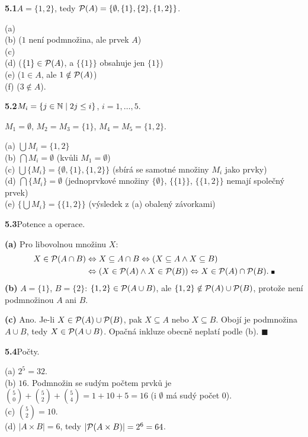 \documentclass[11pt,a4paper]{article}
\newcommand{\zad}[2]{\par\Needspace*{4cm}\vspace{1.1em}\noindent\textcolor{accent}{\sffamily\bfseries #1}\enspace #2\par}
\begin{document}

\zad{5.1}{$A=\{1,2\}$, tedy $\mathcal P(A)=\{\emptyset,\{1\},\{2\},\{1,2\}\}$.}
\begin{reseni}
(a) \pravda\\
(b) \nepravda ($1$ není podmnožina, ale prvek $A$)\\
(c) \pravda\\
(d) \pravda ($\{1\}\in\mathcal P(A)$, a $\{\{1\}\}$ obsahuje jen $\{1\}$)\\
(e) \nepravda ($1\in A$, ale $1\notin\mathcal P(A)$)\\
(f) \nepravda ($3\notin A$).
\end{reseni}

\zad{5.2}{$M_i=\{j\in\mathbb N\mid 2j\le i\}$, $i=1,\dots,5$.}
\begin{reseni}
$M_1=\emptyset$, $M_2=M_3=\{1\}$, $M_4=M_5=\{1,2\}$.

(a) $\bigcup M_i=\{1,2\}$\\
(b) $\bigcap M_i=\emptyset$ (kvůli $M_1=\emptyset$)\\
(c) $\bigcup\{M_i\}=\{\emptyset,\{1\},\{1,2\}\}$ (sbírá se samotné množiny $M_i$ jako prvky)\\
(d) $\bigcap\{M_i\}=\emptyset$ (jednoprvkové množiny $\{\emptyset\}$, $\{\{1\}\}$, $\{\{1,2\}\}$ nemají společný prvek)\\
(e) $\{\bigcup M_i\}=\{\{1,2\}\}$ (výsledek z (a) obalený závorkami)
\end{reseni}

\zad{5.3}{Potence a operace.}
\begin{reseni}
\textbf{(a)} Pro libovolnou množinu $X$:
\[
\begin{aligned}
X\in\Pot(A\cap B)&\Leftrightarrow X\subseteq A\cap B\Leftrightarrow(X\subseteq A\land X\subseteq B)\\
&\Leftrightarrow(X\in\Pot(A)\land X\in\Pot(B))\Leftrightarrow X\in\Pot(A)\cap\Pot(B).\ \blacksquare
\end{aligned}
\]
\textbf{(b)} $A=\{1\}$, $B=\{2\}$: $\{1,2\}\in\mathcal P(A\cup B)$, ale $\{1,2\}\notin\mathcal P(A)\cup\mathcal P(B)$, protože není podmnožinou $A$ ani $B$.

\textbf{(c)} Ano. Je-li $X\in\mathcal P(A)\cup\mathcal P(B)$, pak $X\subseteq A$ nebo $X\subseteq B$. Obojí je podmnožina $A\cup B$, tedy $X\in\mathcal P(A\cup B)$. Opačná inkluze obecně neplatí podle (b). \hfill$\blacksquare$
\end{reseni}

\zad{5.4}{Počty.}
\begin{reseni}
(a) $2^5=32$.\\
(b) $16$. Podmnožin se sudým počtem prvků je $\binom50+\binom52+\binom54=1+10+5=16$ (i $\emptyset$ má sudý počet 0).\\
(c) $\binom52=10$.\\
(d) $|A\times B|=6$, tedy $|\mathcal P(A\times B)|=2^6=64$.
\end{reseni}
\end{document}
